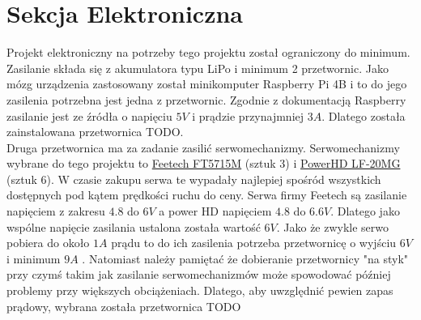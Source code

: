\chapter{Sekcja Elektroniczna}
Projekt elektroniczny na potrzeby tego projektu został ograniczony do minimum. Zasilanie składa się z akumulatora typu LiPo i minimum 2 przetwornic. Jako mózg urządzenia zastosowany został minikomputer Raspberry Pi 4B i to do jego zasilenia potrzebna jest jedna z przetwornic. Zgodnie z dokumentacją Raspberry zasilanie jest ze źródła o napięciu $5V$ i prądzie przynajmniej $3A$.\cite{RPI_power_sup} Dlatego została zainstalowana przetwornica TODO.\\

Druga przetwornica ma za zadanie zasilić serwomechanizmy. Serwomechanizmy wybrane do tego projektu to \href{https://botland.com.pl/serwa-typu-standard/9182-serwo-feetech-ft5715m-standard-5904422312756.html}{Feetech FT5715M} (sztuk 3) i \href{https://botland.com.pl/serwa-typu-standard/3576-serwo-powerhd-lf-20mg-standard-6939670200387.html}{PowerHD LF-20MG} (sztuk 6). W czasie zakupu serwa te wypadały najlepiej spośród wszystkich dostępnych pod kątem prędkości ruchu do ceny. Serwa firmy Feetech są zasilanie napięciem z zakresu $4.8$ do $6V$ a power HD napięciem $4.8$ do $6.6V$. Dlatego jako wspólne napięcie zasilania ustalona została wartość $6V$. Jako że zwykle serwo pobiera do około $1A$ prądu to do ich zasilenia potrzeba przetwornicę o wyjściu $6V$ i minimum $9A$ \cite{Servo_power_sup}. Natomiast należy pamiętać że dobieranie przetwornicy "na styk" przy czymś takim jak zasilanie serwomechanizmów może spowodować później problemy przy większych obciążeniach. Dlatego, aby uwzględnić pewien zapas prądowy, wybrana została przetwornica TODO